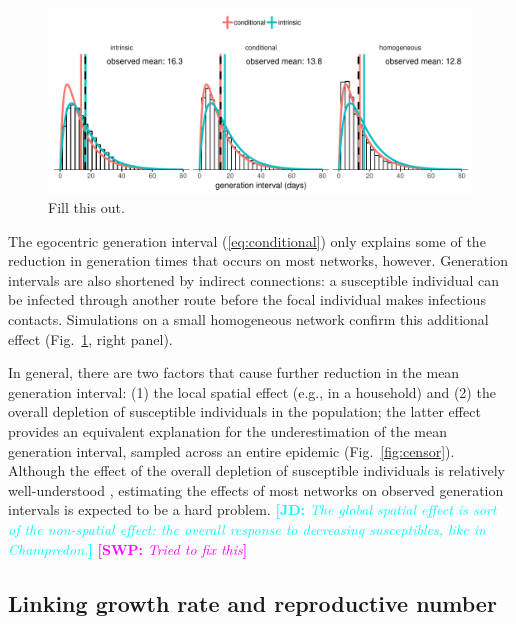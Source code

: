 \documentclass[12pt]{article}
\newcommand{\eref}[1]{(\ref{eq:#1})}
\newcommand{\fref}[1]{Fig.~\ref{fig:#1}}
\newcommand{\comment}[3]{\textcolor{#1}{\textbf{[#2: }\textsl{#3}\textbf{]}}}
\newcommand{\jd}[1]{\comment{cyan}{JD}{#1}}
\newcommand{\swp}[1]{\comment{magenta}{SWP}{#1}}
\begin{document}
\begin{figure}
\includegraphics[width=\textwidth]{../fig/local_effect.pdf}
\caption{Fill this out.}
\label{fig:local}
\end{figure}

The egocentric generation interval \eref{conditional} only explains some of the reduction in generation times that occurs on most networks, however.
Generation intervals are also shortened by indirect connections: a susceptible individual can be infected through another route before the focal individual makes infectious contacts.
Simulations on a small homogeneous network confirm this additional effect (\fref{local}, right panel). 

In general, there are two factors that cause further reduction in the mean generation interval: (1) the local spatial effect (e.g., in a household) and (2) the overall depletion of susceptible individuals in the population;
the latter effect provides an equivalent explanation for the underestimation of the mean generation interval, sampled across an entire epidemic (\fref{censor}). 
Although the effect of the overall depletion of susceptible individuals is relatively well-understood \citep{champredon2015intrinsic}, estimating the effects of most networks on observed generation intervals is expected to be a hard problem. 
\jd{The global spatial effect is sort of the non-spatial effect: the overall response to decreasing susceptibles, like in Champredon.}
\swp{Tried to fix this}

\subsection{Linking growth rate and reproductive number}
\end{document}
